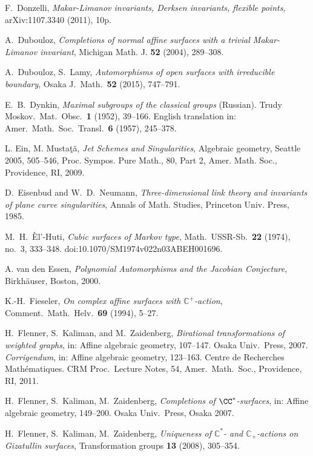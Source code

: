 F.~Donzelli, \emph{
Makar-Limanov invariants, Derksen invariants,
flexible points},
arXiv:1107.3340 (2011), 10p.

A.~Dubouloz,
\emph{Completions of normal affine surfaces
with a trivial Makar-Limanov invariant},
Michigan Math. J. \textbf{52} (2004), 289--308.

A.~Dubouloz, S.~Lamy,  \emph{Automorphisms of open surfaces with irreducible boundary}, Osaka J.\ Math.\ \textbf{52} (2015), 747--791.

E.~B.~Dynkin,  \emph{Maximal subgroups of the classical groups} (Russian). Trudy Moskov.\ Mat.\ Obsc.\ \textbf{1} (1952), 39--166.
English translation in: Amer.\ Math.\ Soc.\ Transl.\ \textbf{6} (1957), 245--378.

L. Ein, M. Musta\c{t}\u{a}, \emph{Jet Schemes and Singularities}, Algebraic geometry,
Seattle 2005, 505--546, Proc. Sympos. Pure Math., 80, Part 2, Amer. Math. Soc., Providence, RI, 2009.

D.~Eisenbud and W.~D.~Neumann,
\emph{Three-dimensional link theory and
invariants of plane curve singularities},
Annals of Math. Studies, Princeton Univ. Press, 1985.

M.~H.~\`El'-Huti, \emph{Cubic surfaces of Markov type},
Math.\ USSR-Sb.\ \textbf{22} (1974), no.~3, 333--348.
doi:10.1070/SM1974v022n03ABEH001696.

A. van den Essen, \emph{Polynomial Automorphisms and the Jacobian Conjecture}, Birkh\"auser, Boston, 2000.

K.-H.~Fieseler, \emph{On complex affine surfaces with $\mathbb{C}^+$-action}, Comment.\ Math.\ Helv.\ \textbf{69} (1994), 5--27.

H.~Flenner, S.~Kaliman, and M.~Zaidenberg,
\emph{ Birational
transformations of weighted graphs},
in: Affine algebraic geometry,  107--147.
Osaka Univ.\ Press, 2007.
\emph{Corrigendum}, in: Affine algebraic geometry, 123--163.
Centre de Recherches
Math\'ematiques. CRM Proc.\ Lecture Notes, 54,
Amer.\ Math.\ Soc., Providence, RI, 2011.

H.~Flenner, S.~Kaliman, M.~Zaidenberg, \emph{ Completions of $\CC^*$-surfaces}, in: Affine
algebraic geometry, 149--200. Osaka Univ.\ Press,
Osaka 2007.

H.~Flenner, S.~Kaliman, M.~Zaidenberg, \emph{ Uniqueness of
${\mathbb C}^*$- and ${\mathbb C}_+$-actions on Gizatullin surfaces}, Transformation
groups \textbf{13} (2008), 305--354.

